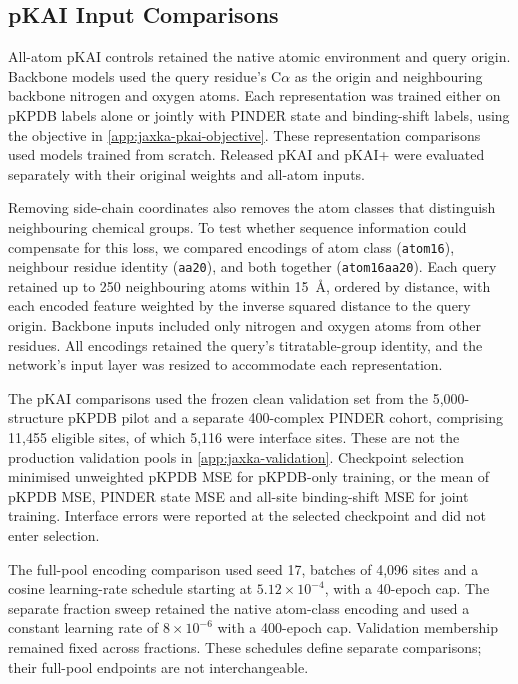\subsection{pKAI Input Comparisons}
\label{app:jaxka-pkai-inputs}

All-atom pKAI controls retained the native atomic environment and query origin. Backbone models used the query residue's C$\alpha$ as the origin and neighbouring backbone nitrogen and oxygen atoms. Each representation was trained either on pKPDB labels alone or jointly with PINDER state and binding-shift labels, using the objective in \cref{app:jaxka-pkai-objective}. These representation comparisons used models trained from scratch. Released pKAI and pKAI+ were evaluated separately with their original weights and all-atom inputs.

Removing side-chain coordinates also removes the atom classes that distinguish neighbouring chemical groups. To test whether sequence information could compensate for this loss, we compared encodings of atom class (\texttt{atom16}), neighbour residue identity (\texttt{aa20}), and both together (\texttt{atom16aa20}). Each query retained up to 250 neighbouring atoms within 15~\AA, ordered by distance, with each encoded feature weighted by the inverse squared distance to the query origin. Backbone inputs included only nitrogen and oxygen atoms from other residues. All encodings retained the query's titratable-group identity, and the network's input layer was resized to accommodate each representation.

The pKAI comparisons used the frozen clean validation set from the 5,000-structure pKPDB pilot and a separate 400-complex PINDER cohort, comprising 11,455 eligible sites, of which 5,116 were interface sites. These are not the production validation pools in \cref{app:jaxka-validation}. Checkpoint selection minimised unweighted pKPDB MSE for pKPDB-only training, or the mean of pKPDB MSE, PINDER state MSE and all-site binding-shift MSE for joint training. Interface errors were reported at the selected checkpoint and did not enter selection.

The full-pool encoding comparison used seed 17, batches of 4,096 sites and a cosine learning-rate schedule starting at $5.12\times10^{-4}$, with a 40-epoch cap. The separate fraction sweep retained the native atom-class encoding and used a constant learning rate of $8\times10^{-6}$ with a 400-epoch cap. Validation membership remained fixed across fractions. These schedules define separate comparisons; their full-pool endpoints are not interchangeable.

